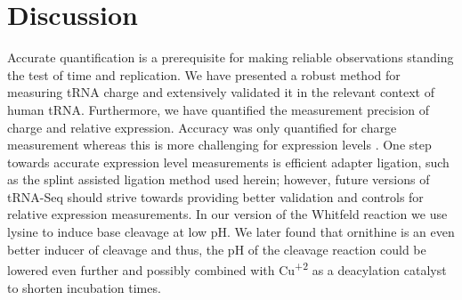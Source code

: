 \documentclass[9pt,lineno]{elife}
\begin{document}
\begin{figure}[ht!]
\label{figsupp:f6S2}
\end{figure}






\section{Discussion}
Accurate quantification is a prerequisite for making reliable observations standing the test of time and replication.
We have presented a robust method for measuring tRNA charge and extensively validated it in the relevant context of human tRNA.
Furthermore, we have quantified the measurement precision of charge and relative expression.
Accuracy was only quantified for charge measurement whereas this is more challenging for expression levels \citep{Fuchs2015-nb}.
One step towards accurate expression level measurements is efficient adapter ligation, such as the splint assisted ligation method used herein; however, future versions of tRNA-Seq should strive towards providing better validation and controls for relative expression measurements.
In our version of the Whitfeld reaction we use lysine to induce base cleavage at low pH.
We later found that ornithine is an even better inducer of cleavage \citep{Uziel1975-ja} and thus, the pH of the cleavage reaction could be lowered even further and possibly combined with Cu\textsuperscript{+2} as a deacylation catalyst \citep{Kroll1952-ci, Schofield1968-qn} to shorten incubation times.
\end{document}
